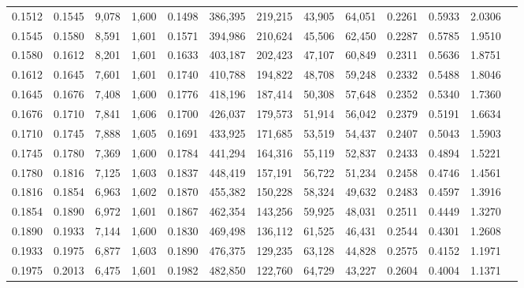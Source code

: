 \begin{tabular}{rrrrrrrrrrrrr}
0.1512 & 0.1545 &  9,078 & 1,600 &                                     0.1498 & 386,395 & 219,215 &  43,905 &  64,051 & 0.2261 & 0.5933 & 2.0306 \\
0.1545 & 0.1580 &  8,591 & 1,601 &                                     0.1571 & 394,986 & 210,624 &  45,506 &  62,450 & 0.2287 & 0.5785 & 1.9510 \\
0.1580 & 0.1612 &  8,201 & 1,601 &                                     0.1633 & 403,187 & 202,423 &  47,107 &  60,849 & 0.2311 & 0.5636 & 1.8751 \\
0.1612 & 0.1645 &  7,601 & 1,601 &                                     0.1740 & 410,788 & 194,822 &  48,708 &  59,248 & 0.2332 & 0.5488 & 1.8046 \\
0.1645 & 0.1676 &  7,408 & 1,600 &                                     0.1776 & 418,196 & 187,414 &  50,308 &  57,648 & 0.2352 & 0.5340 & 1.7360 \\
0.1676 & 0.1710 &  7,841 & 1,606 &                                     0.1700 & 426,037 & 179,573 &  51,914 &  56,042 & 0.2379 & 0.5191 & 1.6634 \\
0.1710 & 0.1745 &  7,888 & 1,605 &                                     0.1691 & 433,925 & 171,685 &  53,519 &  54,437 & 0.2407 & 0.5043 & 1.5903 \\
0.1745 & 0.1780 &  7,369 & 1,600 &                                     0.1784 & 441,294 & 164,316 &  55,119 &  52,837 & 0.2433 & 0.4894 & 1.5221 \\
0.1780 & 0.1816 &  7,125 & 1,603 &                                     0.1837 & 448,419 & 157,191 &  56,722 &  51,234 & 0.2458 & 0.4746 & 1.4561 \\
0.1816 & 0.1854 &  6,963 & 1,602 &                                     0.1870 & 455,382 & 150,228 &  58,324 &  49,632 & 0.2483 & 0.4597 & 1.3916 \\
0.1854 & 0.1890 &  6,972 & 1,601 &                                     0.1867 & 462,354 & 143,256 &  59,925 &  48,031 & 0.2511 & 0.4449 & 1.3270 \\
0.1890 & 0.1933 &  7,144 & 1,600 &                                     0.1830 & 469,498 & 136,112 &  61,525 &  46,431 & 0.2544 & 0.4301 & 1.2608 \\
0.1933 & 0.1975 &  6,877 & 1,603 &                                     0.1890 & 476,375 & 129,235 &  63,128 &  44,828 & 0.2575 & 0.4152 & 1.1971 \\
0.1975 & 0.2013 &  6,475 & 1,601 &                                     0.1982 & 482,850 & 122,760 &  64,729 &  43,227 & 0.2604 & 0.4004 & 1.1371 \\

\end{tabular}
